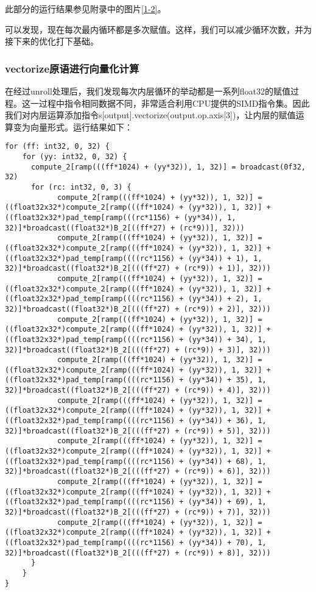 此部分的运行结果参见附录中的图片\textcolor{MidnightBlue}{\ref{1-2}}。

可以发现，现在每次最内循环都是多次赋值。这样，我们可以减少循环次数，并为接下来的优化打下基础。

\subsubsection{vectorize原语进行向量化计算}

在经过unroll处理后，我们发现每次内层循环的举动都是一系列float32的赋值过程。这一过程中指令相同数据不同，非常适合利用CPU提供的SIMD指令集。因此我们对内层运算添加指令s[output].vectorize(output.op.axis[3])，让内层的赋值运算变为向量形式。运行结果如下：

\begin{lstlisting}[caption=向量化计算后的循环表达式]
for (ff: int32, 0, 32) {
    for (yy: int32, 0, 32) {
      compute_2[ramp(((ff*1024) + (yy*32)), 1, 32)] = broadcast(0f32, 32)
      for (rc: int32, 0, 3) {
            compute_2[ramp(((ff*1024) + (yy*32)), 1, 32)] = ((float32x32*)compute_2[ramp(((ff*1024) + (yy*32)), 1, 32)] + ((float32x32*)pad_temp[ramp(((rc*1156) + (yy*34)), 1, 32)]*broadcast((float32*)B_2[((ff*27) + (rc*9))], 32)))
            compute_2[ramp(((ff*1024) + (yy*32)), 1, 32)] = ((float32x32*)compute_2[ramp(((ff*1024) + (yy*32)), 1, 32)] + ((float32x32*)pad_temp[ramp((((rc*1156) + (yy*34)) + 1), 1, 32)]*broadcast((float32*)B_2[(((ff*27) + (rc*9)) + 1)], 32)))
            compute_2[ramp(((ff*1024) + (yy*32)), 1, 32)] = ((float32x32*)compute_2[ramp(((ff*1024) + (yy*32)), 1, 32)] + ((float32x32*)pad_temp[ramp((((rc*1156) + (yy*34)) + 2), 1, 32)]*broadcast((float32*)B_2[(((ff*27) + (rc*9)) + 2)], 32)))
            compute_2[ramp(((ff*1024) + (yy*32)), 1, 32)] = ((float32x32*)compute_2[ramp(((ff*1024) + (yy*32)), 1, 32)] + ((float32x32*)pad_temp[ramp((((rc*1156) + (yy*34)) + 34), 1, 32)]*broadcast((float32*)B_2[(((ff*27) + (rc*9)) + 3)], 32)))
            compute_2[ramp(((ff*1024) + (yy*32)), 1, 32)] = ((float32x32*)compute_2[ramp(((ff*1024) + (yy*32)), 1, 32)] + ((float32x32*)pad_temp[ramp((((rc*1156) + (yy*34)) + 35), 1, 32)]*broadcast((float32*)B_2[(((ff*27) + (rc*9)) + 4)], 32)))
            compute_2[ramp(((ff*1024) + (yy*32)), 1, 32)] = ((float32x32*)compute_2[ramp(((ff*1024) + (yy*32)), 1, 32)] + ((float32x32*)pad_temp[ramp((((rc*1156) + (yy*34)) + 36), 1, 32)]*broadcast((float32*)B_2[(((ff*27) + (rc*9)) + 5)], 32)))
            compute_2[ramp(((ff*1024) + (yy*32)), 1, 32)] = ((float32x32*)compute_2[ramp(((ff*1024) + (yy*32)), 1, 32)] + ((float32x32*)pad_temp[ramp((((rc*1156) + (yy*34)) + 68), 1, 32)]*broadcast((float32*)B_2[(((ff*27) + (rc*9)) + 6)], 32)))
            compute_2[ramp(((ff*1024) + (yy*32)), 1, 32)] = ((float32x32*)compute_2[ramp(((ff*1024) + (yy*32)), 1, 32)] + ((float32x32*)pad_temp[ramp((((rc*1156) + (yy*34)) + 69), 1, 32)]*broadcast((float32*)B_2[(((ff*27) + (rc*9)) + 7)], 32)))
            compute_2[ramp(((ff*1024) + (yy*32)), 1, 32)] = ((float32x32*)compute_2[ramp(((ff*1024) + (yy*32)), 1, 32)] + ((float32x32*)pad_temp[ramp((((rc*1156) + (yy*34)) + 70), 1, 32)]*broadcast((float32*)B_2[(((ff*27) + (rc*9)) + 8)], 32)))
      }
    }
}
\end{lstlisting}

